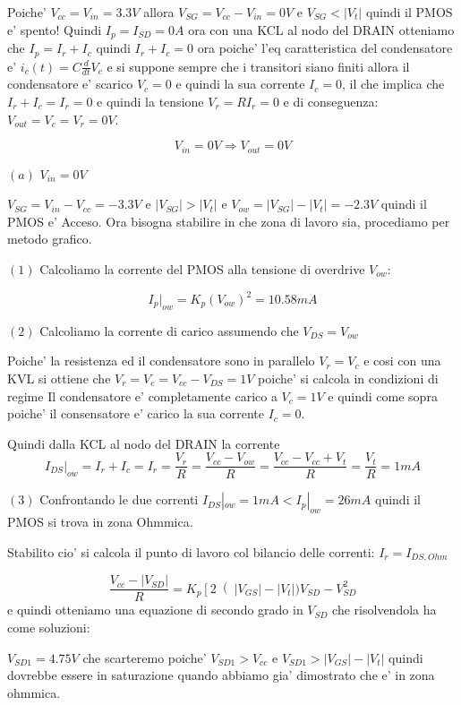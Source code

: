 \documentclass[\main/main.tex]{subfiles}
\begin{document}
Poiche' $V_{cc} = V_{in} = 3.3V$ allora $V_{SG} = V_{cc} - V_{in} = 0V$ e 
$V_{SG} < |V_t|$ quindi il PMOS e' spento! Quindi $I_p = I_{SD} = 0A$ ora con una KCL al nodo del DRAIN otteniamo che $I_p = I_r + I_c$ quindi $I_r + I_c = 0$ ora poiche' l'eq caratteristica del condensatore e' $i_c(t) = C \frac{d}{dt}V_c$ e si suppone sempre che i transitori siano finiti allora il condensatore e' scarico $V_c = 0$ e quindi la sua corrente $I_c = 0$, il che implica che $I_r + I_c = I_r = 0$ e quindi la tensione $V_r = R I_r = 0$ e di conseguenza: $V_{out} = V_c = V_r = 0V$.

\[V_{in} = 0V \Rightarrow V_{out} = 0V\]

$(a)$ $V_{in} = 0V$

$V_{SG} = V_{in} - V_{cc} = -3.3V$ e $|V_{SG}| > |V_t|$ e $V_{ow} = |V_{SG}| - |V_t| = -2.3V$ quindi il PMOS e' Acceso.
Ora bisogna stabilire in che zona di lavoro sia, procediamo per metodo grafico.

$(1)$ Calcoliamo la corrente del PMOS alla tensione di overdrive $V_{ow}$:

\[I_p |_{ow} = K_p \left(V_{ow}\right)^2 = 10.58mA\]

$(2)$ Calcoliamo la corrente di carico assumendo che $V_{DS} = V_{ow}$

Poiche' la resistenza ed il condensatore sono in parallelo $V_r = V_c$ e cosi con una KVL si ottiene che $V_r = V_c = V_{cc} - V_{DS} = 1V$ poiche' si calcola in condizioni di regime Il condensatore e' completamente carico a $V_c = 1V$  e quindi come sopra poiche' il consensatore e' carico la sua corrente $I_c = 0$.

Quindi dalla KCL al nodo del DRAIN la corrente \[I_{DS}|_{ow} = I_r + I_c = I_r = \frac{V_r}{R}= \frac{ V_{cc} - V_{ow}}{R} =  \frac{ V_{cc} - V_{cc} + V_t}{R} = \frac{V_t}{R} = 1mA\]

$(3)$ Confrontando le due correnti $I_{DS}|_{ow} = 1mA < I_p |_{ow} = 26mA$ quindi il PMOS si trova in zona Ohmmica.


Stabilito cio' si calcola il punto di lavoro col bilancio delle correnti:
$I_r = I_{DS,Ohm}$

\[\frac{V_{cc} - |V_{SD}|}{R} = K_p \left[ 2 \right(|V_{GS}| - |V_t|)V_{SD} - V_{SD}^2\]
e quindi otteniamo una equazione di secondo grado in $V_{SD}$ che risolvendola ha come soluzioni:

$V_{SD1} = 4.75V$ che scarteremo poiche' $V_{SD1} > V_{cc}$ e $V_{SD1} > |V_{GS}| - |V_t|$ quindi dovrebbe essere in saturazione quando abbiamo gia' dimostrato che e' in zona ohmmica.
\end{document}
